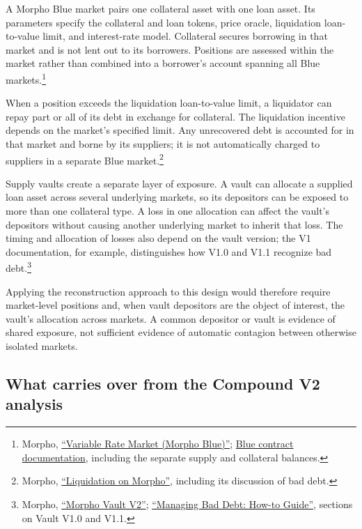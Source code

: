 \documentclass[a4paper,UKenglish,cleveref, autoref, thm-restate]{informs3}
\DeclareRobustCommand{\latestrev}[1]{{\color{red}\hypersetup{linkcolor=red,citecolor=red,urlcolor=red}#1}}
\newenvironment{latestrevisions}{\begingroup\color{red}\hypersetup{linkcolor=red,citecolor=red,urlcolor=red}}{\endgroup}
\begin{document}
\begin{latestrevisions}
A Morpho Blue market pairs one collateral asset with one loan asset. Its parameters specify the collateral and loan tokens, price oracle, liquidation loan-to-value limit, and interest-rate model. Collateral secures borrowing in that market and is not lent out to its borrowers. Positions are assessed within the market rather than combined into a borrower's account spanning all Blue markets.\footnote{\latestrev{Morpho, \href{https://docs.morpho.org/learn/concepts/blue/}{``Variable Rate Market (Morpho Blue)''}; \href{https://docs.morpho.org/developers/contracts/blue/}{Blue contract documentation}, including the separate supply and collateral balances.}}

When a position exceeds the liquidation loan-to-value limit, a liquidator can repay part or all of its debt in exchange for collateral. The liquidation incentive depends on the market's specified limit. Any unrecovered debt is accounted for in that market and borne by its suppliers; it is not automatically charged to suppliers in a separate Blue market.\footnote{\latestrev{Morpho, \href{https://docs.morpho.org/learn/concepts/liquidation/}{``Liquidation on Morpho''}, including its discussion of bad debt.}}

Supply vaults create a separate layer of exposure. A vault can allocate a supplied loan asset across several underlying markets, so its depositors can be exposed to more than one collateral type. A loss in one allocation can affect the vault's depositors without causing another underlying market to inherit that loss. The timing and allocation of losses also depend on the vault version; the V1 documentation, for example, distinguishes how V1.0 and V1.1 recognize bad debt.\footnote{\latestrev{Morpho, \href{https://docs.morpho.org/learn/concepts/vault-v2/}{``Morpho Vault V2''}; \href{https://docs.morpho.org/curate/tutorials-v1/bad-debt/}{``Managing Bad Debt: How-to Guide''}, sections on Vault V1.0 and V1.1.}}

Applying the reconstruction approach to this design would therefore require market-level positions and, when vault depositors are the object of interest, the vault's allocation across markets. A common depositor or vault is evidence of shared exposure, not sufficient evidence of automatic contagion between otherwise isolated markets.

\subsection{What carries over from the Compound V2 analysis}
\label{app:later_protocols_implications}


\end{latestrevisions}
\end{document}
